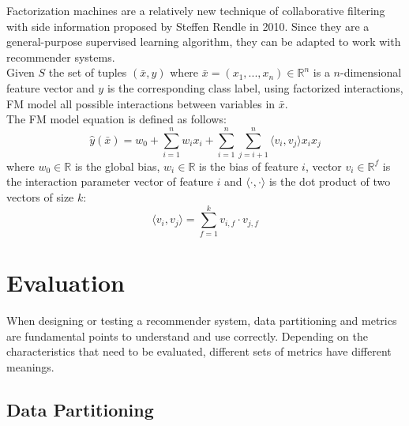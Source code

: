 Factorization machines \cite{10.1109/ICDM.2010.127} are a relatively new technique of collaborative filtering with side information proposed by Steffen Rendle in 2010. Since they are a general-purpose supervised learning algorithm, they can be adapted to work with recommender systems.\\
Given $S$ the set of tuples $(\bar{x}, y)$ where $\bar{x} = (x_1, ..., x_n) \in \mathbb{R}^n$ is a $n$-dimensional feature vector and $y$ is the corresponding class label, using factorized interactions, FM model all possible interactions between variables in $\bar{x}$.\\
The FM model equation is defined as follows:
\begin{equation*}
\hat{y}(\bar{x}) = w_0 + \sum_{i = 1}^{n} w_i x_i + \sum_{i = 1}^{n} \sum_{j = i + 1}^{n} \langle v_i, v_j \rangle x_i x_j
\end{equation*}
where $w_0 \in \mathbb{R}$ is the global bias, $w_i \in \mathbb{R}$ is the bias of feature $i$, vector $v_i \in \mathbb{R}^f$ is the interaction parameter vector of feature $i$ and $\langle \cdot, \cdot \rangle$ is the dot product of two vectors of size $k$:
\begin{equation*}
\langle v_i, v_j \rangle = \sum_{f = 1}^{k} v_{i,f} \cdot v_{j,f}
\end{equation*}



\section{Evaluation}

When designing or testing a recommender system, data partitioning and metrics are fundamental points to understand and use correctly. Depending on the characteristics that need to be evaluated, different sets of metrics have different meanings.


\subsection{Data Partitioning}

